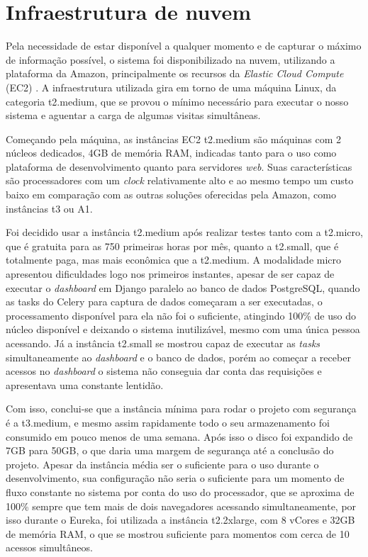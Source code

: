 \section{Infraestrutura de nuvem}
\indent
\par Pela necessidade de estar disponível a qualquer momento e de capturar o máximo de informação possível, o sistema foi disponibilizado na nuvem, utilizando a plataforma da Amazon, principalmente os recursos da \textit{Elastic Cloud Compute} (EC2) \cite{EC2}. A infraestrutura utilizada gira em torno de uma máquina Linux, da categoria t2.medium, que se provou o mínimo necessário para executar o nosso sistema e aguentar a carga de algumas visitas simultâneas.
\indent
\par Começando pela máquina, as instâncias EC2 t2.medium são máquinas com 2 núcleos dedicados, 4GB de memória RAM, indicadas tanto para o uso como plataforma de desenvolvimento quanto para servidores \textit{web}. Suas características são processadores com um \textit{clock} relativamente alto e ao mesmo tempo um custo baixo em comparação com as outras soluções oferecidas pela Amazon, como instâncias t3 ou A1. 
\indent
\par Foi decidido usar a instância t2.medium após realizar testes tanto com a t2.micro, que é gratuita para as 750 primeiras horas por mês, quanto a t2.small, que é totalmente paga, mas mais econômica que a t2.medium. A modalidade micro apresentou dificuldades logo nos primeiros instantes, apesar de ser capaz de executar o \textit{dashboard} em Django paralelo ao banco de dados PostgreSQL, quando as tasks do Celery para captura de dados começaram a ser executadas, o processamento disponível para ela não foi o suficiente, atingindo 100\% de uso do núcleo disponível e deixando o sistema inutilizável, mesmo com uma única pessoa acessando. Já a instância t2.small se mostrou capaz de executar as \textit{tasks} simultaneamente ao \textit{dashboard} e o banco de dados, porém ao começar a receber acessos no \textit{dashboard} o sistema não conseguia dar conta das requisições e apresentava uma constante lentidão. 
\indent
\par Com isso, conclui-se que a instância mínima para rodar o projeto com segurança é a t3.medium, e mesmo assim rapidamente todo o seu armazenamento foi consumido em pouco menos de uma semana. Após isso o disco foi expandido de 7GB para 50GB, o que daria uma margem de segurança até a conclusão do projeto. Apesar da instância média ser o suficiente para o uso durante o desenvolvimento, sua configuração não seria o suficiente para um momento de fluxo constante no sistema por conta do uso do processador, que se aproxima de 100\% sempre que tem mais de dois navegadores acessando simultaneamente, por isso durante o Eureka, foi utilizada a instância t2.2xlarge, com 8 vCores e 32GB de memória RAM, o que se mostrou suficiente para momentos com cerca de 10 acessos simultâneos.

